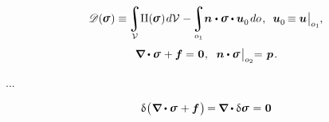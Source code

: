 \nopagebreak
\begin{equation}\label{thecomplementaryenergyfunctional}
\complementaryenergyfunctional (\hspace{-0.1ex}\linearstress\hspace{.1ex})
\equiv \hspace{-0.2ex}
\displaystyle \integral\displaylimits_{\mathcal{V}} \hspace{-0.5ex}
\complementaryenergydensity(\hspace{-0.1ex}\linearstress\hspace{.1ex}) \hspace{.2ex} d\mathcal{V} \hspace{.1ex}
- \hspace{-0.2ex}
\displaystyle\integral\displaylimits_{o_1} \hspace{-0.5ex}
\unitnormalvector \hspace{.1ex} \dotp \linearstress \dotp \bm{u}_{\raisemath{-0.1em}{0}} \hspace{.25ex} do
\hspace{.2ex} ,
\hspace{.5em}
\bm{u}_{\raisemath{-0.1em}{0}} \hspace{-0.2ex} \equiv \bm{u} \hspace{.1ex} \bigr|_{o_1}
\hspace{-0.1ex} ,
\end{equation}
%
\nopagebreak\vspace{-0.4em}\begin{equation*}
\boldnabla \dotp \linearstress \hspace{.15ex} + \bm{f} = \hspace{.1ex} \zerovector \hspace{.1ex} ,
\hspace{.6em}
\unitnormalvector \dotp \linearstress \hspace{.2ex} \bigr|_{o_2} \hspace{-0.66ex} = \hspace{.2ex} \bm{p}
\hspace{.2ex} .
\end{equation*}

...


\noindent
\begin{equation*}\label{the variation of the balance of force equation}
\variation{\hspace{.1ex} \bigl( \hspace{.1ex}
\boldnabla \dotp \linearstress
\hspace{.15ex} +
\bm{f}
\hspace{.15ex} \bigr)} \hspace{-0.2ex}
= \hspace{-0.1ex}
\boldnabla \dotp \variation{\linearstress} \hspace{.15ex}
= \hspace{.1ex} \zerovector
\end{equation*}

